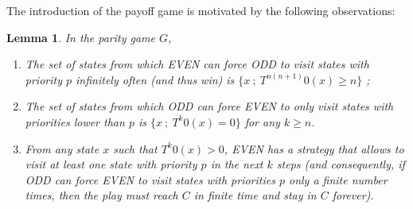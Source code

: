 \documentclass{article}
\newtheorem{lemma}{Lemma}
\begin{document}
The introduction of the payoff game is motivated by the following observations:
\begin{lemma}
  In the parity game $G$,
  \begin{enumerate}
  \item The set of states from which EVEN can force ODD to visit states with priority $p$ infinitely often (and thus win) is $\{ x ~;~ T^{n(n+1)}0(x) \ge n \}$ ;
  \item The set of states from which ODD can force EVEN to \emph{only} visit states with priorities lower than $p$ is $\{ x ~;~ T^k 0(x)=0 \}$ for any $k \ge n$.
  \item From any state $x$ such that $T^k 0(x)>0$, EVEN has a strategy that allows to visit at least one state with priority $p$ in the next $k$ steps (and consequently, if ODD can force EVEN to visit states with priorities $p$ only a finite number times, then the play must reach $C$ in finite time and stay in $C$ forever). 
  \end{enumerate}
\end{lemma}
\end{document}
